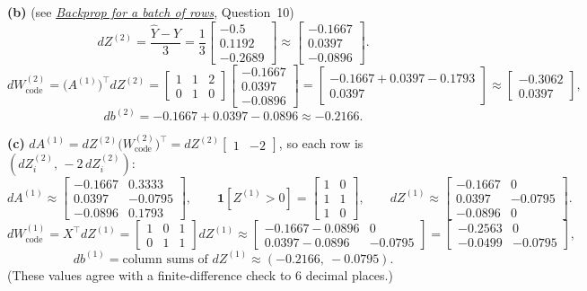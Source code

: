 \documentclass[12pt,a4paper]{article}
\newcommand{\seeconcept}[3]{(see \hyperref[#1]{\textit{#2}}, Question~#3)}
\begin{document}
\textbf{(b)} \seeconcept{c:batchbackprop}{Backprop for a batch of rows}{10}
\[
dZ^{(2)}=\frac{\hat Y-Y}{3}=\frac13\begin{bmatrix}-0.5\\0.1192\\-0.2689\end{bmatrix}\approx\begin{bmatrix}-0.1667\\0.0397\\-0.0896\end{bmatrix}.
\]
\[
dW^{(2)}_{\text{code}}=\bigl(A^{(1)}\bigr)^\top dZ^{(2)}=\begin{bmatrix}1&1&2\\0&1&0\end{bmatrix}\begin{bmatrix}-0.1667\\0.0397\\-0.0896\end{bmatrix}=\begin{bmatrix}-0.1667+0.0397-0.1793\\0.0397\end{bmatrix}\approx\begin{bmatrix}-0.3062\\0.0397\end{bmatrix},
\]
\[
db^{(2)}=-0.1667+0.0397-0.0896\approx-0.2166 .
\]

\textbf{(c)} $dA^{(1)}=dZ^{(2)}\bigl(W^{(2)}_{\text{code}}\bigr)^\top=dZ^{(2)}\begin{bmatrix}1&-2\end{bmatrix}$, so each row is $(dZ^{(2)}_i,\,-2\,dZ^{(2)}_i)$:
\[
dA^{(1)}\approx\begin{bmatrix}-0.1667&0.3333\\0.0397&-0.0795\\-0.0896&0.1793\end{bmatrix},\qquad
\mathbf 1[Z^{(1)}>0]=\begin{bmatrix}1&0\\1&1\\1&0\end{bmatrix},\qquad
dZ^{(1)}\approx\begin{bmatrix}-0.1667&0\\0.0397&-0.0795\\-0.0896&0\end{bmatrix}.
\]
\[
dW^{(1)}_{\text{code}}=X^\top dZ^{(1)}=\begin{bmatrix}1&0&1\\0&1&1\end{bmatrix}dZ^{(1)}\approx\begin{bmatrix}-0.1667-0.0896&0\\0.0397-0.0896&-0.0795\end{bmatrix}=\begin{bmatrix}-0.2563&0\\-0.0499&-0.0795\end{bmatrix},
\]
\[
db^{(1)}=\text{column sums of }dZ^{(1)}\approx(-0.2166,\ -0.0795).
\]
(These values agree with a finite-difference check to 6 decimal places.)
\end{document}

